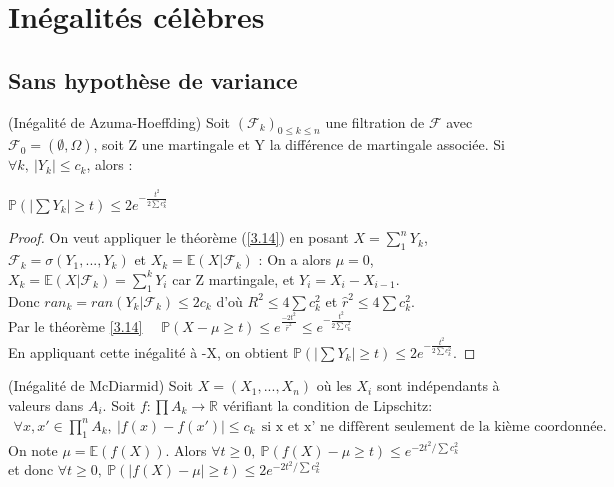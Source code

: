 \section{Inégalités célèbres}

\subsection{Sans hypothèse de variance}

\begin{theorem} (Inégalité de Azuma-Hoeffding)
\label{HA3.10}
Soit $(\mathcal{F}_k)_{0\leq k \leq n}$ une filtration de $\mathcal{F}$ avec $ \mathcal{F}_0 =  (\emptyset , \Omega) $, soit Z une martingale et Y la différence de martingale associée.
Si $\forall k, ~ |Y_{k}| \leq c_{k}$, alors :

$ \mathbb{P}(|\sum Y_k| \geq t) \leq 2 e^{-\frac{t^2}{2 \sum c_k^2}}$
 
\end{theorem}

\begin{proof}
On veut appliquer le théorème (\ref{3.14}) en posant $X=\sum_{1}^{n}Y_k$, $\mathcal{F}_k=\sigma(Y_1,...,Y_k)$ et $X_k=\mathbb{E}(X|\mathcal{F}_k)$ :
On a alors $\mu=0$, $X_k=\mathbb{E}(X|\mathcal{F}_k)=\sum_{1}^{k}Y_i $ car Z martingale, et $Y_i=X_i-X_{i-1}$.\\
Donc $ran_k=ran(Y_k|\mathcal{F}_k) \leq 2c_k$ d'où $R^2 \leq 4 \sum c_k^2$ et $\hat r^2 \leq 4 \sum c_k^2$.\\
Par le théorème \ref{3.14}~~ $\mathbb{P}(X-\mu \geq t) \leq e^{\frac{-2t^2}{\hat r^2}} \leq e^{-\frac{t^2}{2\sum c_k^2}}$\\
En appliquant cette inégalité à -X, on obtient $ \mathbb{P}(|\sum Y_k| \geq t) \leq 2 e^{-\frac{t^2}{2 \sum c_k^2}}$.
\end{proof}

\begin{theorem} (Inégalité de McDiarmid)
\label{mcdiarmid}
Soit $X=(X_1,...,X_n)$ où les $X_i$ sont indépendants à valeurs dans $A_i$.
Soit $f : \prod A_k \rightarrow \mathbb{R}$ vérifiant la condition de Lipschitz:
\begin{eqnarray}
\forall x,x' \in \prod_{1}^{n} A_k,~ |f(x)-f(x')| \leq c_k ~~
\mbox{si x et x' ne diffèrent seulement de la kième coordonnée.}
\label{CL}
\end{eqnarray} 
On note $\mu=\mathbb{E}(f(X))$.
Alors $\forall t \geq 0, ~ \mathbb{P}(f(X)-\mu \geq t) \leq e^{-2t^2/\sum c_k^2}$\\ et donc $\forall t \geq 0, ~ \mathbb{P}(|f(X)-\mu| \geq t) \leq 2e^{-2t^2/\sum c_k^2}$
\end{theorem}


